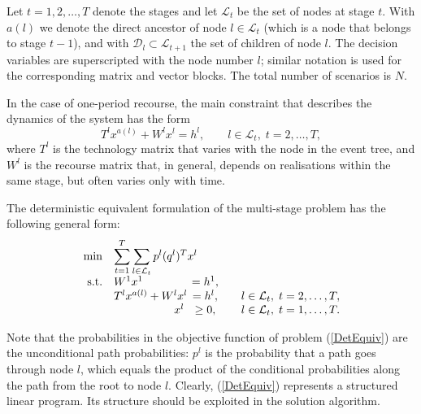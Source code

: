 Let $t = 1,2,\ldots,T$ denote the stages and let $\mathcal{L}_t$ 
be the set of nodes at stage $t$.
With $a(l)$ we denote the direct ancestor of node $l\in\mathcal{L}_t$ 
(which is a node that belongs to stage $t-1$), and with
$\mathcal{D}_l\subset\mathcal{L}_{t+1}$ the set of children of node $l$.
The decision variables are superscripted with the node number $l$;
similar notation is used for the corresponding matrix and vector blocks.
The total number of scenarios is $N$.

In the case of one-period recourse, 
the main constraint that describes the dynamics of the system has the form 
\[
  T^{l}x^{a(l)} +W^{l}x^{l} =h^{l}, \qquad l \in\mathcal{L}_t,\; t=2,\ldots,T,
\]
%
where $T^{l}$ is the technology matrix that varies 
with the node in the event tree, and $W^{l}$ is the recourse
matrix that, in general, depends on realisations within the same stage,
but often varies only with time.

The deterministic equivalent formulation of the multi-stage 
problem has the following general form:
\begin{equation}  \label{DetEquiv}
  \begin{array}{rlcll}
  \min & \displaystyle\sum_{t=1}^T\sum_{l\in\mathcal{L}_t} p^l (q^l)^T x^{l}\\
  \mbox{s.t.} & W^1 x^1            & \hspace{-1.5em} = h^1, \\
    & T^{l} x^{a(l)} + W^{l} x^{l} & \hspace{-1.5em} = h^{l}, 
                               &\quad l\in\mathcal{L}_t,\; t = 2,\dots,T, \\
    & \hspace{5.3em} x^{l}         & \hspace{-1.5em} \geq 0,
                               &\quad l\in\mathcal{L}_t,\; t = 1,\dots,T. \\
  \end{array}
\end{equation}

Note that the probabilities in the objective function of problem 
(\ref{DetEquiv}) are the unconditional path probabilities: $p^l$ is 
the probability that a path goes through node $l$, which equals the 
product of the conditional probabilities along the path from the root 
to node $l$.
Clearly, (\ref{DetEquiv}) represents a structured linear program. Its 
structure should be exploited in the solution algorithm.

